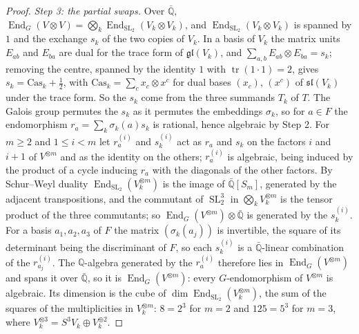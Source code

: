 \documentclass[11pt,reqno]{amsart}
\theoremstyle{plain}
\theoremstyle{definition}
\theoremstyle{remark}
\newcommand{\QQ}{\mathbb{Q}}
\DeclareMathOperator{\End}{End}
\DeclareMathOperator{\SL}{SL}
\begin{document}
\begin{proof}
\emph{Step 3: the partial swaps.} Over $\bar{\QQ}$,
$\End_{G}(V\otimes V)=\bigotimes_{k}\End_{\SL_{2}}(V_{k}\otimes V_{k})$, and
$\End_{\SL_{2}}(V_{k}\otimes V_{k})$ is spanned by $1$ and the exchange $s_{k}$
of the two copies of $V_{k}$. In a basis of $V_{k}$ the matrix units
$E_{ab}$ and $E_{ba}$ are dual for the trace form of $\mathfrak{gl}(V_{k})$,
and $\sum_{a,b}E_{ab}\otimes E_{ba}=s_{k}$; removing the centre, spanned by the
identity $1$ with $\operatorname{tr}(1\cdot1)=2$, gives
$s_{k}=\mathrm{Cas}_{k}+\frac12$, with $\mathrm{Cas}_{k}=\sum_{c}x_{c}\otimes
x^{c}$ for dual bases $(x_{c})$, $(x^{c})$ of $\mathfrak{sl}(V_{k})$ under the
trace form. So the $s_{k}$ come from the three summands $T_{k}$ of $T$. The Galois group permutes the $s_{k}$ as it
permutes the embeddings $\sigma_{k}$, so for $a\in F$ the endomorphism
$r_{a}=\sum_{k}\sigma_{k}(a)s_{k}$ is rational, hence algebraic by Step 2. For
$m\ge2$ and $1\le i<m$ let $r_{a}^{(i)}$ and $s_{k}^{(i)}$ act as $r_{a}$ and
$s_{k}$ on the factors $i$ and $i+1$ of $V^{\otimes m}$ and as the identity on
the others; $r_{a}^{(i)}$ is algebraic, being induced by the product of a cycle
inducing $r_{a}$ with the diagonals of the other factors. By Schur--Weyl
duality $\End_{\SL_{2}}(V_{k}^{\otimes m})$ is the image of
$\bar{\QQ}[S_{m}]$, generated by the adjacent transpositions, and the
commutant of $\SL_{2}^{3}$ in $\bigotimes_{k}V_{k}^{\otimes m}$ is the tensor
product of the three commutants; so $\End_{G}(V^{\otimes m})\otimes\bar{\QQ}$
is generated by the $s_{k}^{(i)}$. For a basis $a_{1},a_{2},a_{3}$ of $F$ the
matrix $(\sigma_{k}(a_{j}))$ is invertible, the square of its determinant being
the discriminant of $F$, so each $s_{k}^{(i)}$ is a $\bar{\QQ}$-linear
combination of the $r_{a_{j}}^{(i)}$. The $\QQ$-algebra generated by the
$r_{a}^{(i)}$ therefore lies in $\End_{G}(V^{\otimes m})$ and spans it over
$\bar{\QQ}$, so it is $\End_{G}(V^{\otimes m})$: every $G$-endomorphism of
$V^{\otimes m}$ is algebraic. Its dimension is the cube of
$\dim\End_{\SL_{2}}(V_{k}^{\otimes m})$, the sum of the squares of the
multiplicities in $V_{k}^{\otimes m}$: $8=2^{3}$ for $m=2$ and $125=5^{3}$ for
$m=3$, where $V_{k}^{\otimes3}=S^{3}V_{k}\oplus V_{k}^{\oplus2}$.


\end{proof}
\end{document}
